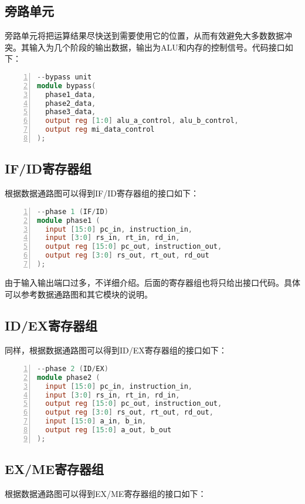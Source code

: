 \subsection{旁路单元}
旁路单元将把运算结果尽快送到需要使用它的位置，从而有效避免大多数数据冲突。其输入为几个阶段的输出数据，输出为ALU和内存的控制信号。代码接口如下：

\begin{lstlisting}[language=verilog,frame=single,breaklines,breaklines,basicstyle=\footnotesize\ttfamily,numbers=left]
--bypass unit
module bypass(
  phase1_data,
  phase2_data,
  phase3_data,
  output reg [1:0] alu_a_control, alu_b_control,
  output reg mi_data_control
);
\end{lstlisting}

\subsection{IF/ID寄存器组}
根据数据通路图可以得到IF/ID寄存器组的接口如下：

\begin{lstlisting}[language=verilog,frame=single,breaklines,breaklines,basicstyle=\footnotesize\ttfamily,numbers=left]
--phase 1 (IF/ID)
module phase1 (
  input [15:0] pc_in, instruction_in,
  input [3:0] rs_in, rt_in, rd_in,
  output reg [15:0] pc_out, instruction_out,
  output reg [3:0] rs_out, rt_out, rd_out
);
\end{lstlisting}

由于输入输出端口过多，不详细介绍。后面的寄存器组也将只给出接口代码。具体可以参考数据通路图和其它模块的说明。

\subsection{ID/EX寄存器组}
同样，根据数据通路图可以得到ID/EX寄存器组的接口如下：

\begin{lstlisting}[language=verilog,frame=single,breaklines,breaklines,basicstyle=\footnotesize\ttfamily,numbers=left]
--phase 2 (ID/EX)
module phase2 (
  input [15:0] pc_in, instruction_in,
  input [3:0] rs_in, rt_in, rd_in,
  output reg [15:0] pc_out, instruction_out,
  output reg [3:0] rs_out, rt_out, rd_out,
  input [15:0] a_in, b_in,
  output reg [15:0] a_out, b_out
);
\end{lstlisting}

\subsection{EX/ME寄存器组}
根据数据通路图可以得到EX/ME寄存器组的接口如下：

